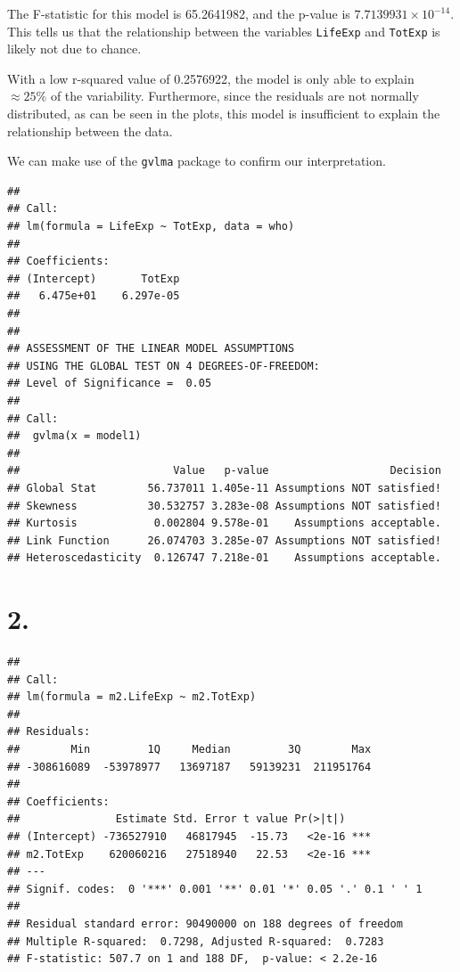 \documentclass[]{article}
\begin{document}
The F-statistic for this model is 65.2641982, and the p-value is
\(7.7139931\times 10^{-14}\). This tells us that the relationship
between the variables \texttt{LifeExp} and \texttt{TotExp} is likely not
due to chance.

With a low r-squared value of 0.2576922, the model is only able to
explain \(\approx 25\%\) of the variability. Furthermore, since the
residuals are not normally distributed, as can be seen in the plots,
this model is insufficient to explain the relationship between the data.

We can make use of the \texttt{gvlma} package to confirm our
interpretation.

\begin{verbatim}
## 
## Call:
## lm(formula = LifeExp ~ TotExp, data = who)
## 
## Coefficients:
## (Intercept)       TotExp  
##   6.475e+01    6.297e-05  
## 
## 
## ASSESSMENT OF THE LINEAR MODEL ASSUMPTIONS
## USING THE GLOBAL TEST ON 4 DEGREES-OF-FREEDOM:
## Level of Significance =  0.05 
## 
## Call:
##  gvlma(x = model1) 
## 
##                        Value   p-value                   Decision
## Global Stat        56.737011 1.405e-11 Assumptions NOT satisfied!
## Skewness           30.532757 3.283e-08 Assumptions NOT satisfied!
## Kurtosis            0.002804 9.578e-01    Assumptions acceptable.
## Link Function      26.074703 3.285e-07 Assumptions NOT satisfied!
## Heteroscedasticity  0.126747 7.218e-01    Assumptions acceptable.
\end{verbatim}

\section{2.}\label{section-1}

\begin{verbatim}
## 
## Call:
## lm(formula = m2.LifeExp ~ m2.TotExp)
## 
## Residuals:
##        Min         1Q     Median         3Q        Max 
## -308616089  -53978977   13697187   59139231  211951764 
## 
## Coefficients:
##               Estimate Std. Error t value Pr(>|t|)    
## (Intercept) -736527910   46817945  -15.73   <2e-16 ***
## m2.TotExp    620060216   27518940   22.53   <2e-16 ***
## ---
## Signif. codes:  0 '***' 0.001 '**' 0.01 '*' 0.05 '.' 0.1 ' ' 1
## 
## Residual standard error: 90490000 on 188 degrees of freedom
## Multiple R-squared:  0.7298, Adjusted R-squared:  0.7283 
## F-statistic: 507.7 on 1 and 188 DF,  p-value: < 2.2e-16
\end{verbatim}
\end{document}
